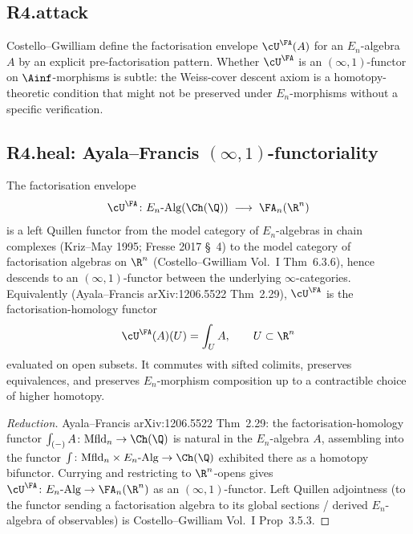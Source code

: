 \subsection*{R4.attack}

Costello--Gwilliam define the factorisation envelope
$\cU^\FA(A)$ for an $E_n$-algebra $A$ by an explicit
pre-factorisation pattern.  Whether $\cU^\FA$ is an
$(\infty,1)$-functor on $\Ainf$-morphisms is subtle: the Weiss-cover
descent axiom is a homotopy-theoretic condition that might not be
preserved under $E_n$-morphisms without a specific verification.

\subsection*{R4.heal: Ayala--Francis $(\infty,1)$-functoriality}

\begin{proposition}
\label{prop:U-FA-inf1-functor}
\ClaimStatusProvedElsewhere
The factorisation envelope
\[
  \cU^\FA \colon
  E_n\text{-Alg}(\Ch(\Q))
  \;\longrightarrow\;
  \FA_n(\R^n)
\]
is a left Quillen functor from the model category of $E_n$-algebras
in chain complexes (Kriz--May 1995; Fresse 2017 \S~4) to the model
category of factorisation algebras on $\R^n$ (Costello--Gwilliam Vol.~I
Thm~6.3.6), hence descends to an $(\infty,1)$-functor between the
underlying $\infty$-categories.  Equivalently
(Ayala--Francis arXiv:1206.5522 Thm~2.29), $\cU^\FA$ is the
factorisation-homology functor
\[
  \cU^\FA(A)(U) = \int_U A, \qquad U \subset \R^n
\]
evaluated on open subsets.  It commutes with sifted colimits, preserves
equivalences, and preserves $E_n$-morphism composition up to a
contractible choice of higher homotopy.
\end{proposition}

\begin{proof}[Reduction]
Ayala--Francis arXiv:1206.5522 Thm~2.29: the factorisation-homology
functor $\int_{(-)} A \colon \mathrm{Mfld}_n \to \Ch(\Q)$ is natural
in the $E_n$-algebra $A$, assembling into the functor
$\int \colon \mathrm{Mfld}_n \times E_n\text{-Alg} \to \Ch(\Q)$
exhibited there as a homotopy bifunctor.  Currying and restricting to
$\R^n$-opens gives
$\cU^\FA \colon E_n\text{-Alg} \to \FA_n(\R^n)$ as an
$(\infty,1)$-functor.  Left Quillen adjointness (to the functor sending
a factorisation algebra to its global sections / derived $E_n$-algebra
of observables) is Costello--Gwilliam Vol.~I Prop~3.5.3.
\end{proof}

